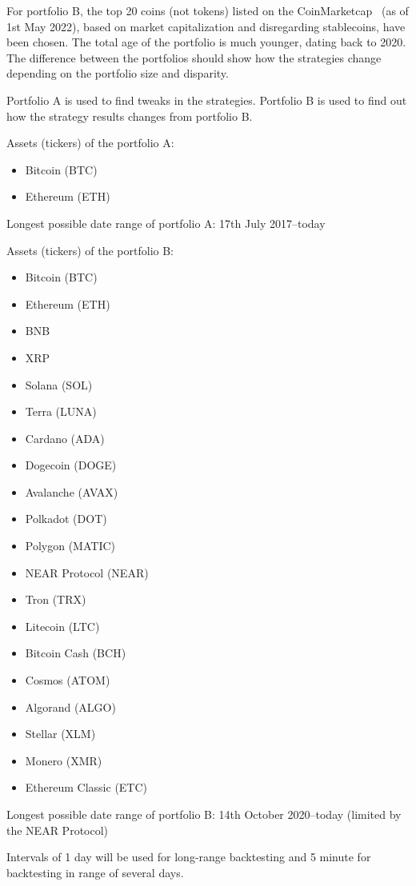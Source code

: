 For portfolio B, the top 20 coins (not tokens) listed on the CoinMarketcap~\cite{coinmarketcap} (as of 1st May 2022), based on market capitalization and disregarding stablecoins, have been chosen. The total age of the portfolio is much younger, dating back to 2020. The difference between the portfolios should show how the strategies change depending on the portfolio size and disparity.

Portfolio A is used to find tweaks in the strategies. Portfolio B is used to find out how the strategy results changes from portfolio B.

Assets (tickers) of the portfolio A:
\begin{itemize}
    \item Bitcoin (BTC)
    \item Ethereum (ETH)
\end{itemize}
Longest possible date range of portfolio A: 17th July 2017--today

Assets (tickers) of the portfolio B:
\begin{itemize}
    \item Bitcoin (BTC)
    \item Ethereum (ETH)
    \item BNB
    \item XRP
    \item Solana (SOL)
    \item Terra (LUNA)
    \item Cardano (ADA)
    \item Dogecoin (DOGE)
    \item Avalanche (AVAX)
    \item Polkadot (DOT)
    \item Polygon (MATIC)
    \item NEAR Protocol (NEAR)
    \item Tron (TRX)
    \item Litecoin (LTC)
    \item Bitcoin Cash (BCH)
    \item Cosmos (ATOM)
    \item Algorand (ALGO)
    \item Stellar (XLM)
    \item Monero (XMR)
    \item Ethereum Classic (ETC)
\end{itemize}
Longest possible date range of portfolio B: 14th October 2020--today (limited by the NEAR Protocol)

Intervals of 1 day will be used for long-range backtesting and 5 minute for backtesting in range of several days.

